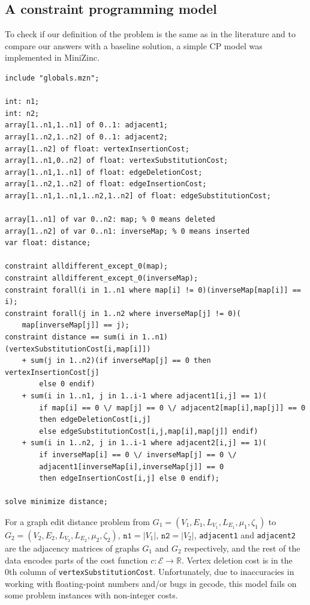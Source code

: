 \documentclass{article}
\theoremstyle{definition}
\begin{document}
\subsection{A constraint programming model}
\label{sec:cp}
To check if our definition of the problem is the same as in the literature and to compare our answers with a baseline solution, a simple CP model was implemented in MiniZinc.
\begin{lstlisting}
include "globals.mzn";

int: n1;
int: n2;
array[1..n1,1..n1] of 0..1: adjacent1;
array[1..n2,1..n2] of 0..1: adjacent2;
array[1..n2] of float: vertexInsertionCost;
array[1..n1,0..n2] of float: vertexSubstitutionCost;
array[1..n1,1..n1] of float: edgeDeletionCost;
array[1..n2,1..n2] of float: edgeInsertionCost;
array[1..n1,1..n1,1..n2,1..n2] of float: edgeSubstitutionCost;

array[1..n1] of var 0..n2: map; % 0 means deleted
array[1..n2] of var 0..n1: inverseMap; % 0 means inserted
var float: distance;

constraint alldifferent_except_0(map);
constraint alldifferent_except_0(inverseMap);
constraint forall(i in 1..n1 where map[i] != 0)(inverseMap[map[i]] == i);
constraint forall(j in 1..n2 where inverseMap[j] != 0)(
    map[inverseMap[j]] == j);
constraint distance == sum(i in 1..n1)(vertexSubstitutionCost[i,map[i]])
    + sum(j in 1..n2)(if inverseMap[j] == 0 then vertexInsertionCost[j]
        else 0 endif)
    + sum(i in 1..n1, j in 1..i-1 where adjacent1[i,j] == 1)(
        if map[i] == 0 \/ map[j] == 0 \/ adjacent2[map[i],map[j]] == 0
        then edgeDeletionCost[i,j]
        else edgeSubstitutionCost[i,j,map[i],map[j]] endif)
    + sum(i in 1..n2, j in 1..i-1 where adjacent2[i,j] == 1)(
        if inverseMap[i] == 0 \/ inverseMap[j] == 0 \/
        adjacent1[inverseMap[i],inverseMap[j]] == 0
        then edgeInsertionCost[i,j] else 0 endif);

solve minimize distance;
\end{lstlisting}
For a graph edit distance problem from $G_1 = (V_1, E_1, L_{V_1}, L_{E_1}, \mu_1, \zeta_1)$ to $G_2 = (V_2, E_2, L_{V_2}, L_{E_2}, \mu_2, \zeta_2)$, $\texttt{n1} = |V_1|$, $\texttt{n2} = |V_2|$, \texttt{adjacent1} and \texttt{adjacent2} are the adjacency matrices of graphs $G_1$ and $G_2$ respectively, and the rest of the data encodes parts of the cost function $c: \mathcal{E} \to \mathbb{R}$. Vertex deletion cost is in the 0th column of \texttt{vertexSubstitutionCost}. Unfortunately, due to inaccuracies in working with floating-point numbers and/or bugs in gecode, this model fails on some problem instances with non-integer costs.
\end{document}
